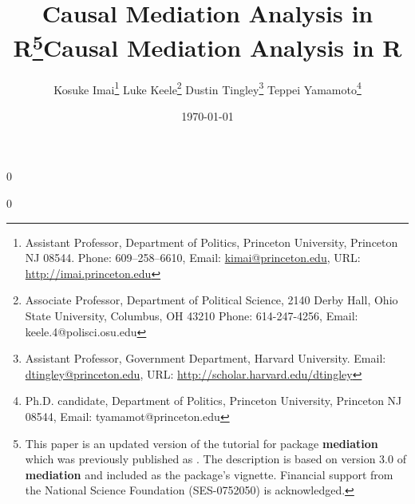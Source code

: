 \documentclass[11pt,letterpaper]{article}
\theoremstyle{plain}
\begin{document}
\newcommand\spacingset[1]{\renewcommand{\baselinestretch}%
{#1}\small\normalsize}

\spacingset{1.2}

\newcommand{\blind}{0}
\newcommand{\polisci}{1}

\newcommand{\tit}{Causal Mediation Analysis in R}




\blind

{\title{\bf \tit\thanks{This paper is an updated version of the tutorial
    for package {\bf mediation} which was previously published as \citet{imai:etal:10}.
    The description is based on version 3.0 of {\bf mediation} and included as 
    the package's vignette.
    Financial support from the National Science Foundation
    (SES-0752050) is acknowledged.}}

  \author{Kosuke Imai\thanks{Assistant Professor, Department of
      Politics, Princeton University, Princeton NJ 08544. Phone:
      609--258--6610, Email:
      \href{mailto:kimai@princeton.edu}{kimai@princeton.edu}, URL:
      \href{http://imai.princeton.edu}{http://imai.princeton.edu}}
    \quad \quad Luke Keele\thanks{Associate Professor, Department of
      Political Science, 2140 Derby Hall, Ohio State University,
      Columbus, OH 43210 Phone: 614-247-4256, Email:
      keele.4@polisci.osu.edu}
    \quad \quad Dustin Tingley\thanks{Assistant Professor, Government Department, Harvard University. Email:
      \href{dtingley@gov.harvard.edu}{dtingley@princeton.edu}, URL:
      \href{http://scholar.harvard.edu/dtingley}{http://scholar.harvard.edu/dtingley}}
    \quad \quad Teppei Yamamoto\thanks{Ph.D. candidate, Department of
      Politics, Princeton University, Princeton NJ 08544, Email: tyamamot@princeton.edu}
}

\date{ \today
}

\maketitle
}\fi

\blind \title{\bf \tit} %
\fi

\end{document}
